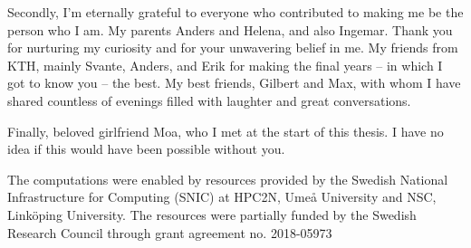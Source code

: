 Secondly, I'm eternally grateful to everyone who contributed to making me be the person who I am. 
My parents Anders and Helena, and also Ingemar. Thank you for nurturing my curiosity and for your unwavering belief in me.
My friends from KTH,
mainly Svante, Anders, and Erik for making the final years -- in which I got to know you -- the best. 
My best friends, Gilbert and Max, with whom I have shared countless of evenings filled with laughter and 
great conversations. 

Finally, beloved girlfriend Moa, who I met at the start of this thesis. I have no idea if this would have been possible without you.

\vspace{9cm}
The computations were enabled by resources provided by the Swedish
National Infrastructure for Computing (SNIC) at HPC2N, Umeå University
and NSC, Linköping University. The resources were partially funded by the Swedish Research 
Council through grant agreement no. 2018-05973